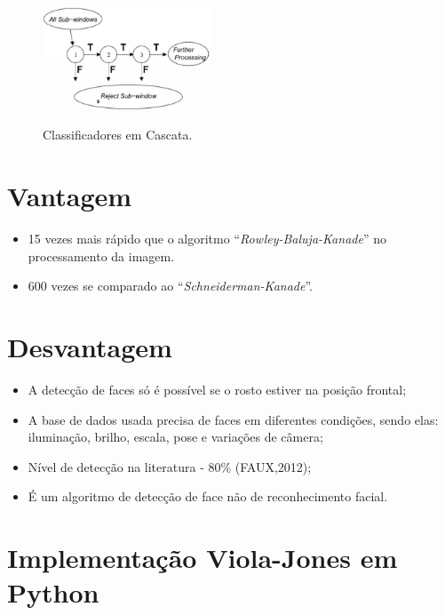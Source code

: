 \documentclass[12pt,a4paper]{article}
\begin{document}
\begin{figure}[h!]
\centering
\includegraphics[width=5cm]{recursos/imagens/cascata.png}
\label{3}
\caption{Classificadores em Cascata.}
\end{figure} 










\section{Vantagem}
\begin{itemize}
	\item 15 vezes mais rápido que o algoritmo “\textit{Rowley-Baluja-Kanade}” no processamento da imagem.

	\item 600 vezes se comparado ao “\textit{Schneiderman-Kanade}”.
\end{itemize}

\section{Desvantagem}
\begin{itemize}
	\item A detecção de faces só é possível se o rosto estiver na posição frontal;
	\item A base de dados usada precisa de faces em diferentes condições, sendo elas: iluminação, brilho, escala, pose e variações de câmera;
	\item Nível de detecção na literatura - 80\% (FAUX,2012);
	\item É um algoritmo de detecção de face não de reconhecimento facial.
\end{itemize}

\section{Implementação Viola-Jones em Python}
\end{document}
